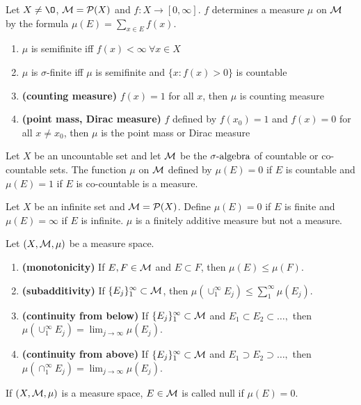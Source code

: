 \begin{example}[measure] Let $X\neq \O$, ${\mathcal M}={\mathcal P}(X)$ and $f: X \rightarrow [0, \infty]$. $f$ determines a measure $\mu$ on ${\mathcal M}$ by the formula $\mu(E)=\sum_{x \in E}f(x)$.
	\begin{enumerate}
\item $\mu$ is semifinite iff $f(x)<\infty\ \forall x \in X$	
\item $\mu$ is $\sigma$-finite iff $\mu$ is semifinite and  $\{ x: f(x)>0\}$ is countable 
\item \textbf{(counting measure)} $f(x)=1$ for all $x$, then $\mu$ is counting measure
\item \textbf{(point mass, Dirac measure)} $f$ defined by $f(x_0)=1$ and $f(x)=0$ for all $x\neq x_0$, then $\mu$ is the point mass or Dirac measure
\end{enumerate}
\end{example}

\begin{example}[measure]
Let $X$ be an uncountable set and let ${\mathcal M}$ be the ${\sigma}\text{-algebra}$ of countable or co-countable sets. The function $\mu$ on ${\mathcal M}$ defined by $\mu(E)=0$ if $E$ is countable and $\mu(E)=1$ if $E$ is co-countable is a measure.
\end{example}
\begin{example}
Let $X$ be an infinite set and ${\mathcal M} = {\mathcal P}(X)$. Define $\mu(E)=0$ if $E$ is finite and $\mu(E)=\infty$ if $E$ is infinite. $\mu$ is a finitely additive measure but not a measure.	
\end{example}
\begin{thm}
Let $(X, {\mathcal M}, \mu)$ be a measure space.
\begin{enumerate}
\item \textbf{(monotonicity)}	If $E, F \in {\mathcal M}$ and $E \subset F$, then $\mu(E) \leq \mu(F)$.
\item \textbf{(subadditivity)}	If $\{E_j\}_1^\infty \subset {\mathcal M}$, then $\mu(\cup_1^\infty E_j) \leq \sum_1^\infty \mu(E_j)$. 
\item \textbf{(continuity from below)}	If $\{E_j\}_1^\infty \subset {\mathcal M}$ and $E_1 \subset E_2 \subset \dots, $ then $\mu(\cup_1^\infty E_j) = \lim_{j \rightarrow \infty} \mu(E_j)$. 
\item \textbf{(continuity from above)}	If $\{E_j\}_1^\infty \subset {\mathcal M}$ and $E_1 \supset E_2 \supset \dots, $ then $\mu(\cap_1^\infty E_j) = \lim_{j \rightarrow \infty} \mu(E_j)$.
\end{enumerate}
\end{thm}
\begin{dfn} If $(X, {\mathcal M}, \mu)$ is a measure space, $E \in {\mathcal M}$ is called null if $\mu(E)=0$.
\end{dfn}


